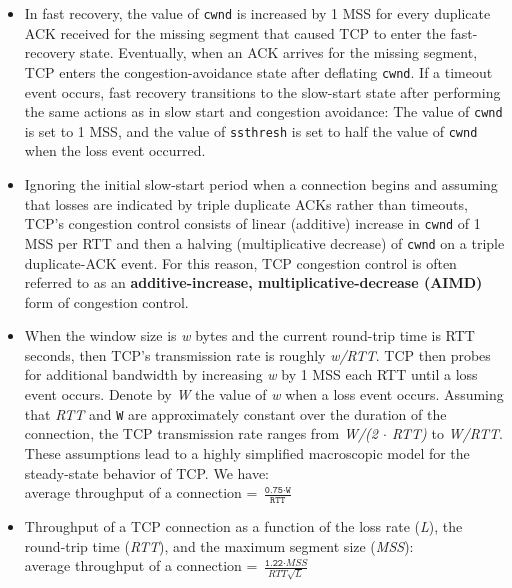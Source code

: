 \begin{itemize}
\item
In fast recovery, the value of \texttt{cwnd} is increased by 1 MSS for every duplicate ACK received for the missing segment that caused TCP to enter the fast-recovery state. Eventually, when an ACK arrives for the missing segment, TCP enters the congestion-avoidance state after deflating \texttt{cwnd}. If a timeout event occurs, fast recovery transitions to the slow-start state after performing the same actions as in slow start and congestion avoidance: The value of \texttt{cwnd} is set to 1 MSS, and the value of \texttt{ssthresh} is set to half the value of \texttt{cwnd} when the loss event occurred.

\item
Ignoring the initial slow-start period when a connection begins and assuming that losses are indicated by triple duplicate ACKs rather than timeouts, TCP's congestion control consists of linear (additive) increase in \texttt{cwnd} of 1 MSS per RTT and then a halving (multiplicative decrease) of \texttt{cwnd} on a triple duplicate-ACK event. For this reason, TCP congestion control is often referred to as an \textbf{additive-increase, multiplicative-decrease (AIMD)} form of congestion control.

\item
When the window size is \textit{w} bytes and the current round-trip time is RTT seconds, then TCP's transmission rate is roughly \textit{w/RTT}. TCP then probes for additional bandwidth by increasing \textit{w} by 1 MSS each RTT until a loss event occurs. Denote by \textit{W} the value of \textit{w} when a loss event occurs. Assuming that \textit{RTT} and \texttt{W} are approximately constant over the duration of the connection, the TCP transmission rate ranges from \textit{W/(2 $\cdot$ RTT)} to \textit{W/RTT}. These assumptions lead to a highly simplified macroscopic model for the steady-state behavior of TCP. We have:\\
\hspace*{1em}average throughput of a connection = $\frac{\texttt{0.75} \cdot \texttt{W}}{\texttt{RTT}}$

\item
Throughput of a TCP connection as a function of the loss rate (\textit{L}), the round-trip time (\textit{RTT}), and the maximum segment size (\textit{MSS}):\\
\hspace*{1em}average throughput of a connection = $\frac{\texttt{1.22} \cdot \textit{MSS}}{\textit{RTT}\sqrt{\textit{L}}}$


\end{itemize}
